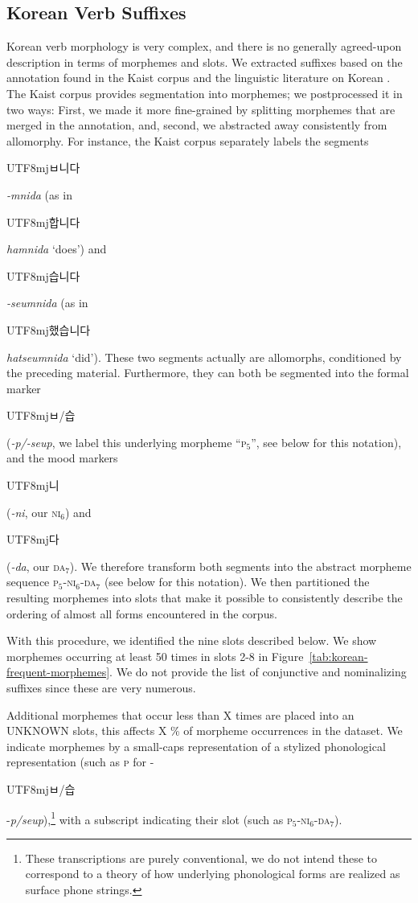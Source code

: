 \documentclass[11pt,letterpaper]{article}
\newcommand{\korean}[1]{\begin{CJK}{UTF8}{mj}#1\end{CJK}}
\begin{document}
\subsection{Korean Verb Suffixes}

Korean verb morphology is very complex, and there is no generally agreed-upon description in terms of morphemes and slots.
We extracted suffixes based on the annotation found in the Kaist corpus and the linguistic literature on Korean \citep{yeon2010korean}.
The Kaist corpus provides segmentation into morphemes; we postprocessed it in two ways:
First, we made it more fine-grained by splitting morphemes that are merged in the annotation, and, second, we abstracted away consistently from allomorphy.
For instance, the Kaist corpus separately labels the segments \korean{ㅂ니다} \textit{-mnida} (as in \korean{합니다} \textit{hamnida} `does') and \korean{습니다} \textit{-seumnida} (as in \korean{했습니다} \textit{hatseumnida} `did').
These two segments actually are allomorphs, conditioned by the preceding material.
Furthermore, they can both be segmented into the formal marker \korean{ㅂ/습} (\textit{-p/-seup}, we label this underlying morpheme ``\textsc{p}$_5$'', see below for this notation), and the mood markers \korean{니} (\textit{-ni}, our \textsc{ni}$_6$) and \korean{다} (\textit{-da}, our \textsc{da}$_7$).
We therefore transform both segments into the abstract morpheme sequence \textsc{p}$_5$-\textsc{ni}$_6$-\textsc{da}$_7$ (see below for this notation).
We then partitioned the resulting morphemes into slots that make it possible to consistently describe the ordering of almost all forms encountered in the corpus.


With this procedure, we identified the nine slots described below. We show morphemes occurring at least 50 times in slots 2-8 in Figure~\ref{tab:korean-frequent-morphemes}.
We do not provide the list of conjunctive and nominalizing suffixes since these are very numerous.

Additional morphemes that occur less than X times are placed into an UNKNOWN slots, this affects X \% of morpheme occurrences in the dataset.
We indicate morphemes by a small-caps representation of a stylized phonological representation (such as \textsc{p} for -\korean{ㅂ/습}  -\textit{p/seup}),\footnote{These transcriptions are purely conventional, we do not intend these to correspond to a theory of how underlying phonological forms are realized as surface phone strings.} with a subscript indicating their slot (such as \textsc{p}$_5$-\textsc{ni}$_6$-\textsc{da}$_7$).
\end{document}
